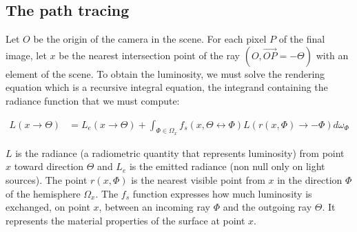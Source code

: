 %
%
%
%
%

\subsection{The path tracing}

Let $O$ be the origin of the camera in the scene. For each pixel $P$ of the final image, let $x$ be the nearest intersection point of the ray $(O, \overrightarrow{OP} = -\Theta)$ with an element of the scene. To obtain the luminosity, we must solve the rendering equation \cite{Ka86} which is a recursive integral equation, the integrand containing the radiance function that we must compute:

\begin{align*}
L(x \rightarrow \Theta) &= L_e(x \rightarrow \Theta) + \int_{\Phi \in \Omega_x} f_s(x, \Theta \leftrightarrow \Phi) L(r(x, \Phi) \rightarrow -\Phi) d\omega_\Phi
\end{align*}

$L$ is the radiance (a radiometric quantity that represents luminosity) from point $x$ toward direction $\Theta$ and $L_e$ is the emitted radiance (non null only on light sources). The point $r(x, \Phi)$ is the nearest visible point from $x$ in the direction $\Phi$ of the hemisphere $\Omega_x$. The $f_s$ function expresses how much luminosity is exchanged, on point $x$, between an incoming ray $\Phi$ and the outgoing ray $\Theta$. It represents the material properties of the surface at point $x$.

